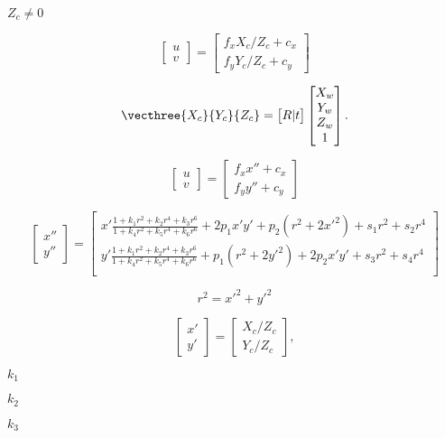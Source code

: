 \documentclass{article}
\begin{document}
$Z_c \ne 0$
\pagebreak

\[\begin{bmatrix} u \\ v \end{bmatrix} = \begin{bmatrix} f_x X_c/Z_c + c_x \\ f_y Y_c/Z_c + c_y \end{bmatrix}\]
\pagebreak

\[\vecthree{X_c}{Y_c}{Z_c} = \begin{bmatrix} R|t \end{bmatrix} \begin{bmatrix} X_w \\ Y_w \\ Z_w \\ 1 \end{bmatrix}.\]
\pagebreak

\[\begin{bmatrix} u \\ v \end{bmatrix} = \begin{bmatrix} f_x x'' + c_x \\ f_y y'' + c_y \end{bmatrix}\]
\pagebreak

\[\begin{bmatrix} x'' \\ y'' \end{bmatrix} = \begin{bmatrix} x' \frac{1 + k_1 r^2 + k_2 r^4 + k_3 r^6}{1 + k_4 r^2 + k_5 r^4 + k_6 r^6} + 2 p_1 x' y' + p_2(r^2 + 2 x'^2) + s_1 r^2 + s_2 r^4 \\ y' \frac{1 + k_1 r^2 + k_2 r^4 + k_3 r^6}{1 + k_4 r^2 + k_5 r^4 + k_6 r^6} + p_1 (r^2 + 2 y'^2) + 2 p_2 x' y' + s_3 r^2 + s_4 r^4 \\ \end{bmatrix}\]
\pagebreak

\[r^2 = x'^2 + y'^2\]
\pagebreak

\[\begin{bmatrix} x'\\ y' \end{bmatrix} = \begin{bmatrix} X_c/Z_c \\ Y_c/Z_c \end{bmatrix},\]
\pagebreak

$k_1$
\pagebreak

$k_2$
\pagebreak

$k_3$
\pagebreak
\end{document}
